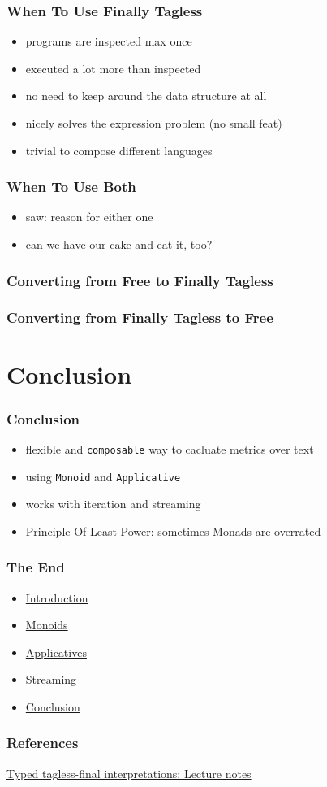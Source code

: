 \documentclass[aspectratio=169, hyperref={colorlinks, linkcolor=beamer@centricgreen}, urlcolor=links]{beamer}
\begin{document}
\begin{frame}
  \frametitle{When To Use Finally Tagless}
  \begin{itemize}
  \item programs are inspected max once
  \item executed a lot more than inspected
  \item no need to keep around the data structure at all
  \item nicely solves the expression problem (no small feat)
  \item trivial to compose different languages
  \end{itemize}
\end{frame}

\begin{frame}
  \frametitle{When To Use Both}
  \begin{itemize}
  \item saw: reason for either one
  \item can we have our cake and eat it, too?
  \end{itemize}
\end{frame}

\begin{frame}
  \frametitle{Converting from Free to Finally Tagless}
\end{frame}

\begin{frame}
  \frametitle{Converting from Finally Tagless to Free}
\end{frame}

\section{Conclusion}\label{sec:conclusion}

\begin{frame}
  \frametitle{Conclusion}
  \begin{itemize}
  \item flexible and \texttt{composable} way to cacluate metrics over text
  \item using \texttt{Monoid} and \texttt{Applicative}
  \item works with iteration and streaming
  \item Principle Of Least Power: sometimes Monads are overrated
  \end{itemize}
\end{frame}

\begin{frame}
  \frametitle{The End}
  \begin{itemize}
  \item \hyperref[sec:introduction]{Introduction}
  \item \hyperref[sec:monoids]{Monoids}
  \item \hyperref[sec:applicatives]{Applicatives}
  \item \hyperref[sec:streaming]{Streaming}
  \item \hyperref[sec:conclusion]{Conclusion}
  \end{itemize}
  \vfill
\end{frame}

\begin{frame}
  \frametitle{References}
  \begin{center}
    \href{http://okmij.org/ftp/tagless-final/course/index.html}{Typed tagless-final interpretations: Lecture notes}
  \end{center}
\end{frame}

\appendix{}
\end{document}
